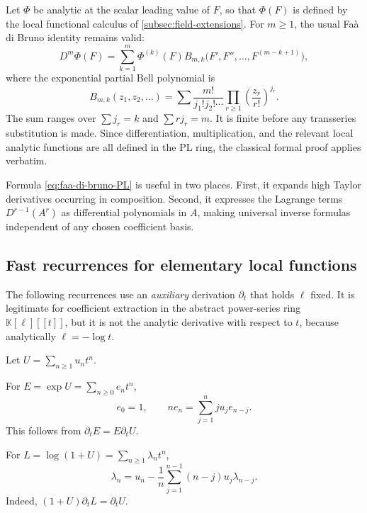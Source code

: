 \documentclass[11pt,oneside]{article}
\numberwithin{equation}{section}
\theoremstyle{definition}
\newcommand{\K}{\mathbb K}
\begin{document}
Let \(\Phi\) be analytic at the scalar leading value of \(F\), so that
\(\Phi(F)\) is defined by the local functional calculus of
\cref{subsec:field-extensions}.  For \(m\ge1\), the usual Fa\`a di Bruno
identity remains valid:
\begin{equation}\label{eq:faa-di-bruno-PL}
  D^m\Phi(F)
   =\sum_{k=1}^{m}\Phi^{(k)}(F)
      B_{m,k}\bigl(F',F'',\ldots,F^{(m-k+1)}\bigr),
\end{equation}
where the exponential partial Bell polynomial is
\begin{equation}\label{eq:exponential-Bell-definition}
 B_{m,k}(z_1,z_2,\ldots)
 =\sum
   \frac{m!}{j_1!j_2!\cdots}
   \prod_{r\ge1}\left(\frac{z_r}{r!}\right)^{j_r}.
\end{equation}
The sum ranges over \(\sum j_r=k\) and \(\sum rj_r=m\).  It is finite before
any transseries substitution is made.  Since differentiation, multiplication,
and the relevant local analytic functions are all defined in the PL ring, the
classical formal proof applies verbatim.

Formula \eqref{eq:faa-di-bruno-PL} is useful in two places.  First, it expands
high Taylor derivatives occurring in composition.  Second, it expresses the
Lagrange terms \(D^{r-1}(A^r)\) as differential polynomials in \(A\), making
universal inverse formulas independent of any chosen coefficient basis.

\subsection{Fast recurrences for elementary local functions}

The following recurrences use an \emph{auxiliary} derivation
\(\partial_t\) that holds \(\ell\) fixed.  It is legitimate for coefficient
extraction in the abstract power-series ring \(\K[\ell][[t]]\), but it is not
the analytic derivative with respect to \(t\), because analytically
\(\ell=-\log t\).

Let \(U=\sum_{n\ge1}u_nt^n\).

For \(E=\exp U=\sum_{n\ge0}e_nt^n\),
\begin{equation}\label{eq:exp-coefficient-recurrence}
  e_0=1,
  \qquad
  ne_n=\sum_{j=1}^{n}j u_j e_{n-j}.
\end{equation}
This follows from \(\partial_tE=E\partial_tU\).

For \(L=\log(1+U)=\sum_{n\ge1}\lambda_nt^n\),
\begin{equation}\label{eq:log-coefficient-recurrence}
  \lambda_n=u_n-\frac1n
  \sum_{j=1}^{n-1}(n-j)u_j\lambda_{n-j}.
\end{equation}
Indeed, \((1+U)\partial_tL=\partial_tU\).
\end{document}
